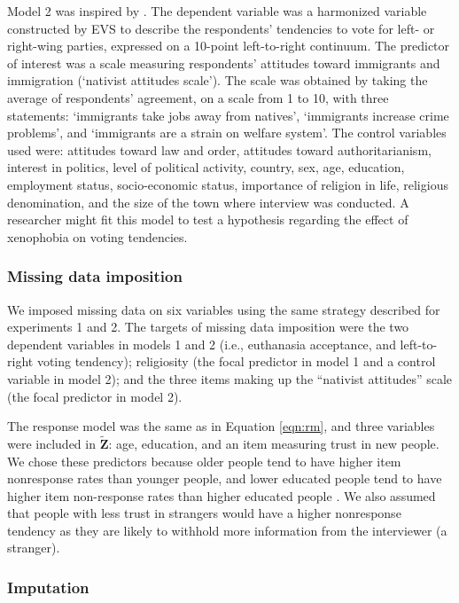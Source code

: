 	Model 2 was inspired by \cite{immerzeel:2015}.
	The dependent variable was a harmonized variable constructed by EVS to describe the respondents' 
	tendencies to vote for left- or right-wing parties, expressed on a 10-point left-to-right continuum.
	The predictor of interest was a scale measuring respondents' attitudes toward immigrants and immigration 
	(`nativist attitudes scale').
	The scale was obtained by taking the average of respondents' agreement, on a scale from 1 to 10, with three 
	statements: `immigrants take jobs away from natives', `immigrants increase crime problems', and 
	`immigrants are a strain on welfare system'.
	The control variables used were: 
	attitudes toward law and order, attitudes toward authoritarianism, interest in politics, level of political activity,  
	country, sex, age, education, employment status, socio-economic status, importance of religion in life, 
	religious denomination, and the size of the town where interview was conducted.
	A researcher might fit this model to test a hypothesis regarding the effect of xenophobia on voting 
	tendencies.

\subsubsection{Missing data imposition}

	We imposed missing data on six variables using the same strategy described for experiments 1 and 2.
	The targets of missing data imposition were the two dependent variables in models 1 and 2 (i.e., 
	euthanasia acceptance, and left-to-right voting tendency); 
	religiosity (the focal predictor in model 1 and a control variable in model 2);
	and the three items making up the ``nativist attitudes'' scale (the focal predictor in model 2).

	The response model was the same as in Equation \eqref{eqn:rm}, and three variables were included in $\tilde{\bm{Z}}$: 
	age, education, and an item measuring trust in new people. 
	We chose these predictors because older people tend to have higher item nonresponse rates than younger people, and 
	lower educated people tend to have higher item non-response rates than higher educated people 
	\citep{guadagnoliCleary:1992, leeuwEtAl:2003}.
	We also assumed that people with less trust in strangers would have a higher nonresponse tendency as 
	they are likely to withhold more information from the interviewer (a stranger).

\subsubsection{Imputation}
	
